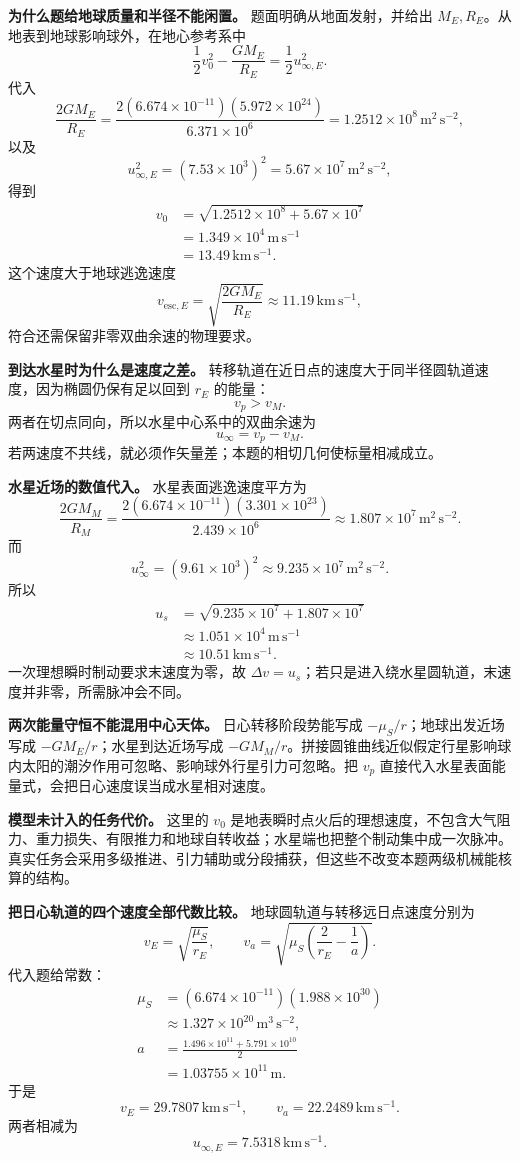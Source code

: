 \documentclass[12pt,a4paper,UTF8]{ctexart}
\begin{document}
\textbf{为什么题给地球质量和半径不能闲置。} 题面明确从地面发射，并给出
\(M_E,R_E\)。从地表到地球影响球外，在地心参考系中 \[
\frac12v_0^2-\frac{GM_E}{R_E}
=\frac12u_{\infty,E}^2.
\] 代入 \[
\frac{2GM_E}{R_E}
=\frac{2(6.674\times10^{-11})(5.972\times10^{24})}
{6.371\times10^6}
=1.2512\times10^8\,\mathrm{m^2\,s^{-2}},
\] 以及 \[
u_{\infty,E}^2
=(7.53\times10^3)^2
=5.67\times10^7\,\mathrm{m^2\,s^{-2}},
\] 得到 \[
\begin{aligned}
v_0
&=\sqrt{1.2512\times10^8+5.67\times10^7}\\
&=1.349\times10^4\,\mathrm{m\,s^{-1}}\\
&=13.49\,\mathrm{km\,s^{-1}}.
\end{aligned}
\] 这个速度大于地球逃逸速度 \[
v_{\mathrm{esc},E}=\sqrt{\frac{2GM_E}{R_E}}
\approx11.19\,\mathrm{km\,s^{-1}},
\] 符合还需保留非零双曲余速的物理要求。

\textbf{到达水星时为什么是速度之差。}
转移轨道在近日点的速度大于同半径圆轨道速度，因为椭圆仍保有足以回到
\(r_E\) 的能量： \[
v_p>v_M.
\] 两者在切点同向，所以水星中心系中的双曲余速为 \[
u_\infty=v_p-v_M.
\] 若两速度不共线，就必须作矢量差；本题的相切几何使标量相减成立。

\textbf{水星近场的数值代入。} 水星表面逃逸速度平方为 \[
\frac{2GM_M}{R_M}
=\frac{2(6.674\times10^{-11})(3.301\times10^{23})}
{2.439\times10^6}
\approx1.807\times10^7\,\mathrm{m^2\,s^{-2}}.
\] 而 \[
u_\infty^2
=(9.61\times10^3)^2
\approx9.235\times10^7\,\mathrm{m^2\,s^{-2}}.
\] 所以 \[
\begin{aligned}
u_s
&=\sqrt{9.235\times10^7+1.807\times10^7}\\
&\approx1.051\times10^4\,\mathrm{m\,s^{-1}}\\
&\approx10.51\,\mathrm{km\,s^{-1}}.
\end{aligned}
\] 一次理想瞬时制动要求末速度为零，故
\(\Delta v=u_s\)；若只是进入绕水星圆轨道，末速度并非零，所需脉冲会不同。

\textbf{两次能量守恒不能混用中心天体。} 日心转移阶段势能写成
\(-\mu_S/r\)；地球出发近场写成 \(-GM_E/r\)；水星到达近场写成
\(-GM_M/r\)。拼接圆锥曲线近似假定行星影响球内太阳的潮汐作用可忽略、影响球外行星引力可忽略。把
\(v_p\) 直接代入水星表面能量式，会把日心速度误当成水星相对速度。

\textbf{模型未计入的任务代价。} 这里的 \(v_0\)
是地表瞬时点火后的理想速度，不包含大气阻力、重力损失、有限推力和地球自转收益；水星端也把整个制动集中成一次脉冲。真实任务会采用多级推进、引力辅助或分段捕获，但这些不改变本题两级机械能核算的结构。

\textbf{把日心轨道的四个速度全部代数比较。}
地球圆轨道与转移远日点速度分别为 \[
v_E=\sqrt{\frac{\mu_S}{r_E}},
\qquad
v_a=\sqrt{\mu_S
\left(\frac2{r_E}-\frac1a\right)}.
\] 代入题给常数： \[
\begin{aligned}
\mu_S
&=(6.674\times10^{-11})(1.988\times10^{30})\\
&\approx1.327\times10^{20}\,\mathrm{m^3\,s^{-2}},
\\
a&=\frac{1.496\times10^{11}+5.791\times10^{10}}2\\
&=1.03755\times10^{11}\,\mathrm m.
\end{aligned}
\] 于是 \[
v_E=29.7807\,\mathrm{km\,s^{-1}},
\qquad
v_a=22.2489\,\mathrm{km\,s^{-1}}.
\] 两者相减为 \[
u_{\infty,E}=7.5318\,\mathrm{km\,s^{-1}}.
\]
\end{document}
